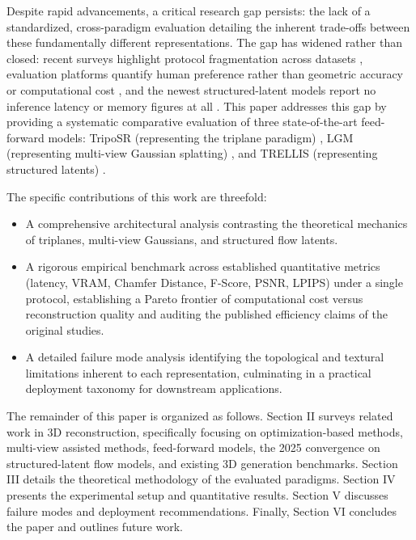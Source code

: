 \documentclass[10pt, conference]{IEEEtran}
\begin{document}
Despite rapid advancements, a critical research gap persists: the lack of a standardized, cross-paradigm evaluation detailing the inherent trade-offs between these fundamentally different representations. The gap has widened rather than closed: recent surveys highlight protocol fragmentation across datasets \cite{survey3d2025}, evaluation platforms quantify human preference rather than geometric accuracy or computational cost \cite{threedgenbench2025,arenad2025,worldscore2025}, and the newest structured-latent models report no inference latency or memory figures at all \cite{triposg2025,hunyuan3d2_2025,lattice2025}. This paper addresses this gap by providing a systematic comparative evaluation of three state-of-the-art feed-forward models: TripoSR (representing the triplane paradigm) \cite{triposr2024}, LGM (representing multi-view Gaussian splatting) \cite{lgm2024}, and TRELLIS (representing structured latents) \cite{trellis2024}. 

The specific contributions of this work are threefold:
\begin{itemize}
    \item A comprehensive architectural analysis contrasting the theoretical mechanics of triplanes, multi-view Gaussians, and structured flow latents.
    \item A rigorous empirical benchmark across established quantitative metrics (latency, VRAM, Chamfer Distance, F-Score, PSNR, LPIPS) under a single protocol, establishing a Pareto frontier of computational cost versus reconstruction quality and auditing the published efficiency claims of the original studies.
    \item A detailed failure mode analysis identifying the topological and textural limitations inherent to each representation, culminating in a practical deployment taxonomy for downstream applications.
\end{itemize}

The remainder of this paper is organized as follows. Section II surveys related work in 3D reconstruction, specifically focusing on optimization-based methods, multi-view assisted methods, feed-forward models, the 2025 convergence on structured-latent flow models, and existing 3D generation benchmarks. Section III details the theoretical methodology of the evaluated paradigms. Section IV presents the experimental setup and quantitative results. Section V discusses failure modes and deployment recommendations. Finally, Section VI concludes the paper and outlines future work.
\end{document}
